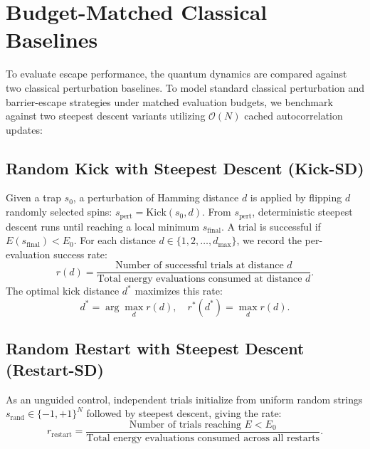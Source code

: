 \documentclass[12pt,a4paper]{report}
\begin{document}
\section{Budget-Matched Classical Baselines}
\label{sec:classical_baselines}
To evaluate escape performance, the quantum dynamics are compared against two classical perturbation baselines. To model standard classical perturbation and barrier-escape strategies under matched evaluation budgets, we benchmark against two steepest descent variants utilizing $\mathcal{O}(N)$ cached autocorrelation updates:

\subsection{Random Kick with Steepest Descent (Kick-SD)}
Given a trap $s_0$, a perturbation of Hamming distance $d$ is applied by flipping $d$ randomly selected spins: $s_{\mathrm{pert}} = \mathrm{Kick}(s_0, d)$. From $s_{\mathrm{pert}}$, deterministic steepest descent runs until reaching a local minimum $s_{\mathrm{final}}$. A trial is successful if $E(s_{\mathrm{final}}) < E_0$. For each distance $d \in \{1, 2, \dots, d_{\max}\}$, we record the per-evaluation success rate:
\begin{equation}
    r(d) = \frac{\text{Number of successful trials at distance } d}{\text{Total energy evaluations consumed at distance } d}.
    \label{eq:rate_d}
\end{equation}
The optimal kick distance $d^*$ maximizes this rate:
\begin{equation}
    d^* = \arg\max_{d} r(d), \quad r^*(d^*) = \max_{d} r(d).
    \label{eq:best_d}
\end{equation}

\subsection{Random Restart with Steepest Descent (Restart-SD)}
As an unguided control, independent trials initialize from uniform random strings $s_{\mathrm{rand}} \in \{-1, +1\}^N$ followed by steepest descent, giving the rate:
\begin{equation}
    r_{\mathrm{restart}} = \frac{\text{Number of trials reaching } E < E_0}{\text{Total energy evaluations consumed across all restarts}}.
\end{equation}
\end{document}

